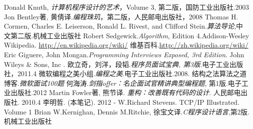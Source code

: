 

\begin{thebibliography}{99}

    Donald Knuth, \emph{计算机程序设计的艺术}，Volume 3, 第二版，国防工业出版社.2003
    Jon Bentley著, 黄倩译.\emph{编程珠玑}，第二版，人民邮电出版社，2008
    Thomas H. Cormen, Charles E. Leiserson, Ronald L. Rivest, and Clifford Stein.\emph{算法导论},中文第二版.机械工业出版社
    Robert Sedgewick.\emph{Algorithm}, Edition 4.Addison-Wesley
    Wikipedia. \url{http://en.wikipedia.org/wiki/}
    维基百科.\url{http://zh.wikipedia.org/wiki/}
     Eric Giguere, John Mongan.\emph{Programming Interviews Exposed, 3rd Edition}. John Wileys \& Sons, Inc .
     欧立奇，刘洋，段韬.\emph{程序员面试宝典, 第3版}.电子工业出版社，2011.4 
     微软编程之美小组.\emph{编程之美}.电子工业出版社.2008.
    结构之法算法之道博客.\emph{微软面试100题}
    何海涛.\emph{剑指offer：名企面试官精讲典型编程题}, 第1版.电子工业出版社.2012
    Martin Fowler著, 熊节译. \emph{重构：改善既有代码的设计}. 人民邮电出版社. 2010.4
    李明哲. \bookname (本笔记). 2012 - \number\year 
    W.Richard Stevens. TCP/IP Illustrated. Volume 1
    Brian W.Kernighan, Dennis M.Ritchie, 徐宝文译.\emph{C程序设计语言},第2版.机械工业出版社

\end{thebibliography}






